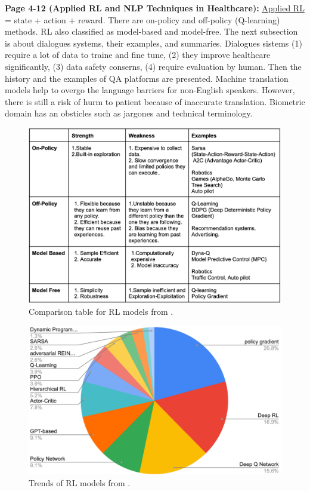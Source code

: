     \textbf{Page 4-12 (Applied RL and NLP Techniques in Healthcare):}
    \underline{Applied RL} = state + action + reward. There are on-policy and off-policy (Q-learning) methods. RL also classified as model-based and model-free. The next subsection is about dialogues systems, their examples, and summaries. Dialogues sistems (1) require a lot of data to traine and fine tune, (2) they improve healthcare significantly, (3) data safety conserns, (4) require evaluation by human. Then the history and the examples of QA platforms are presented. Machine translation models help to overgo the language barriers for non-English speakers. However, there is still a risk of hurm to patient because of inaccurate translation. Biometric domain has an obsticles such as jargones and technical terminology.
    \begin{figure}[H]
        \centering
        \includegraphics[width=1\textwidth]{figures/0022_SR06US23/fig4.png}
        \caption{Comparison table for RL models from \cite{x090}.}
        \label{fig4:0022_SR06US23}
    \end{figure}
    \begin{figure}[H]
        \centering
        \includegraphics[width=1\textwidth]{figures/0022_SR06US23/fig5.png}
        \caption{Trends of RL models from \cite{x090}.}
        \label{fig5:0022_SR06US23}
    \end{figure}

